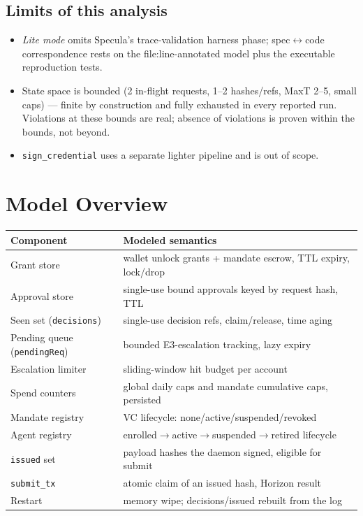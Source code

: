 \documentclass[11pt]{article}
\newcommand{\code}[1]{\texttt{#1}}
\begin{document}
\subsection{Limits of this analysis}

\begin{itemize}[nosep]
  \item \emph{Lite mode} omits Specula's trace-validation harness phase;
        spec$\leftrightarrow$code correspondence rests on the file:line-annotated
        model plus the executable reproduction tests.
  \item State space is bounded (2 in-flight requests, 1--2 hashes/refs,
        MaxT 2--5, small caps) — finite by construction and fully exhausted in
        every reported run. Violations at these bounds are real; absence of
        violations is proven within the bounds, not beyond.
  \item \code{sign\_credential} uses a separate lighter pipeline and is out of
        scope.
\end{itemize}

\section{Model Overview}

\begin{longtable}{@{}p{}p{}@{}}
\toprule
\textbf{Component} & \textbf{Modeled semantics} \\
\midrule
\endhead
Grant store & wallet unlock grants + mandate escrow, TTL expiry, lock/drop \\
Approval store & single-use bound approvals keyed by request hash, TTL \\
Seen set (\code{decisions}) & single-use decision refs, claim/release, time aging \\
Pending queue (\code{pendingReq}) & bounded E3-escalation tracking, lazy expiry \\
Escalation limiter & sliding-window hit budget per account \\
Spend counters & global daily caps and mandate cumulative caps, persisted \\
Mandate registry & VC lifecycle: none/active/suspended/revoked \\
Agent registry & enrolled$\to$active$\to$suspended$\to$retired lifecycle \\
\code{issued} set & payload hashes the daemon signed, eligible for submit \\
\code{submit\_tx} & atomic claim of an issued hash, Horizon result \\
Restart & memory wipe; decisions/issued rebuilt from the log \\
\bottomrule
\end{longtable}
\end{document}
